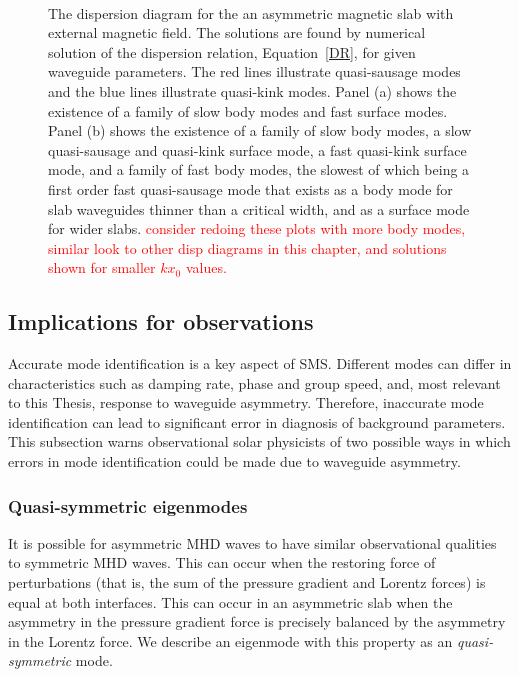 \documentclass[12pt,draft]{../style-files/ociamthesis}
\begin{document}
\begin{figure}[]
	\centering
	 \\
	\caption{The dispersion diagram for the an asymmetric magnetic slab with external magnetic field. The solutions are found by numerical solution of the dispersion relation, Equation~\eqref{DR}, for given waveguide parameters. The red lines illustrate quasi-sausage modes and the blue lines illustrate quasi-kink modes. Panel (a) shows the existence of a family of slow body modes and fast surface modes. Panel (b) shows the existence of a family of slow body modes, a slow quasi-sausage and quasi-kink surface mode, a fast quasi-kink surface mode, and a family of fast body modes, the slowest of which being a first order fast quasi-sausage mode that exists as a body mode for slab waveguides thinner than a critical width, and as a surface mode for wider slabs. \textcolor{red}{consider redoing these plots with more body modes, similar look to other disp diagrams in this chapter, and solutions shown for smaller $kx_0$ values.}}
	\label{fig: disp mag}
\end{figure}


\subsection{Implications for observations}

Accurate mode identification is a key aspect of SMS. Different modes can differ in characteristics such as damping rate, phase and group speed, and, most relevant to this Thesis, response to waveguide asymmetry. Therefore, inaccurate mode identification can lead to significant error in diagnosis of background parameters. This subsection warns observational solar physicists of two possible ways in which errors in mode identification  could be made due to waveguide asymmetry.


\subsubsection{Quasi-symmetric eigenmodes}

It is possible for asymmetric MHD waves to have similar observational qualities to symmetric MHD waves. This can occur when the restoring force of perturbations (that is, the sum of the pressure gradient and Lorentz forces) is equal at both interfaces. This can occur in an asymmetric slab when the asymmetry in the pressure gradient force is precisely balanced by the asymmetry in the Lorentz force. We describe an eigenmode with this property as an \textit{quasi-symmetric} mode.
\end{document}
